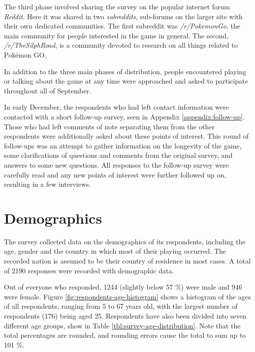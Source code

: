 The third phase involved sharing the survey on the popular internet forum \emph{Reddit}. Here it was shared in two \emph{subreddits}, sub-forums on the larger site with their own dedicated communities. The first subreddit was \emph{/r/PokemonGo}, the main community for people interested in the game in general. The second, \emph{/r/TheSilphRoad}, is a community devoted to research on all things related to Pokémon GO.

In addition to the three main phases of distribution, people encountered playing or talking about the game at any time were approached and asked to participate throughout all of September.

In early December, the respondents who had left contact information were contacted with a short follow-up survey, seen in Appendix \ref{appendix:follow-up}. Those who had left comments of note separating them from the other respondents were additionally asked about these points of interest. This round of follow-ups was an attempt to gather information on the longevity of the game, some clarifications of questions and comments from the original survey, and answers to some new questions. All responses to the follow-up survey were carefully read and any new points of interest were further followed up on, resulting in a few interviews.

\section{Demographics}
\label{sec:player-study-demographics}

The survey collected data on the demographics of its respondents, including the age, gender and the country in which most of their playing occurred. The recorded nation is assumed to be their country of residence in most cases. A total of 2190 responses were recorded with demographic data.

Out of everyone who responded, 1244 (slightly below 57 \%) were male and 946 were female. Figure \ref{fig:respondents-age-histogram} shows a histogram of the ages of all respondents, ranging from 5 to 67 years old, with the largest number of respondents (176) being aged 25. Respondents have also been divided into seven different age groups, show in Table \ref{tbl:survey-age-distribution}. Note that the total percentages are rounded, and rounding errors cause the total to sum up to 101 \%.

